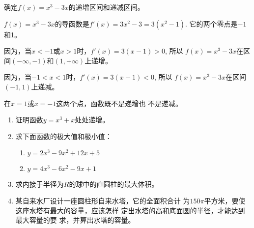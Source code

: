 \begin{example}
  确定$f(x)=x^3-3x$的递增区间和递减区间。  
\end{example}

\begin{solution}
$f(x)=x^3-3x$的导函数是$f'(x)=3x^2-3=3(x^2-
1)$. 它的两个零点是$-1$和1。

因为，当$x<-1$或$x>1$时，$f'(x)=3(x-1)>0$, 所以
$f(x)=x^3-3x$在区间$(-\infty,-1)$和$(1,+\infty)$上递增。

因为，当$-1<x<1$时，$f'(x)=3(x-1)<0$, 所以
$f(x)=x^3-3x$在区间$(-1,1)$上递减。
\end{solution}

\begin{rmk}
在$x=1$或$x=-1$这两个点，函数既不是递增也
不是递减。
\end{rmk}

\begin{example}
    
\end{example}

\begin{solution}
    
\end{solution}


\begin{example}
    
\end{example}

\begin{solution}
    
\end{solution}


\begin{ex}
\begin{enumerate}
    \item 证明函数$y=x^3+x$处处递增。
    \item 求下面函数的极大值和极小值：
\begin{enumerate}
    \item $y=2x^3-9x^2+12x+5$
    \item $y=4x^3-6x^2-9x+1$
\end{enumerate}
    \item 求内接于半径为$R$的球中的直圆柱的最大体积。
    \item 某自来水厂设计一座圆柱形自来水塔，它的全面积合计
    为$150\pi$平方米，要使这座水塔有最大的容量，应该怎样
    定出水塔的高和底面圆的半径，才能达到最大容量的要
    求，并算出水塔的容量。
\end{enumerate}
\end{ex}

